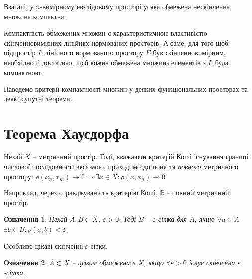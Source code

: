 \documentclass[14pt,twoside]{extreport}
\theoremstyle{mystyle}
\newtheorem{dfn}{Означення}
\numberwithin{equation}{chapter}
\begin{document}
Взагалі, у $n$-вимірному евклідовому просторі усяка обмежена нескінченна множина компактна.

Компактність обмежених множин є характеристичною властивістю скінченновимірних лінійних нормованих просторів. А саме, для того щоб підпростір $L$ лінійного нормованого простору $E$ був скінченновимірним, необхідно й достатньо, щоб кожна обмежена множина елементів з $L$ була компактною.

Наведемо критерії компактності множин у деяких функціональних просторах та деякі супутні теореми.

\section{Теорема Хаусдорфа}

Нехай $X$ -- метричний простір. Тоді, вважаючи критерій Коші існування границі числової послідовності аксіомою, приходимо до поняття \emph{повного} метричного простору:
$\rho(x_n, x_m) \to 0 \Rightarrow \exists x \in X:  \rho(x, x_n) \to 0 $

Наприклад, через справджуваність критерію Коші, $\mathbb{R}$ -- повний метричний простір.

\begin{dfn} Нехай $A, B \subset X$, $\varepsilon > 0$. Тоді $B$ -- $\varepsilon$-сітка для $A$, якщо $\forall a\in A$ $\exists b \in B: \rho(a, b) < \varepsilon$.
\end{dfn}

Особливо цікаві скінченні $\varepsilon$-сітки.

\begin{dfn}	$A \subset X$ -- цілком обмежена в $X$, якщо $\forall \varepsilon>0$ існує скінченна $\varepsilon$-сітка.
\end{dfn}
\end{document}
